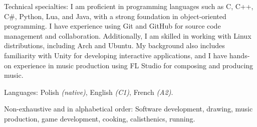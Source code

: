 \documentclass[10pt,a4paper]{article} %
\begin{document}

\inlineheadsection %
{Technical specialties:}
{I am proficient in programming languages such as C, C++, C\#, Python, Lua, and Java, 
with a strong foundation in object-oriented programming. I have experience using Git and 
GitHub for source code management and collaboration. Additionally, I am skilled in working 
with Linux distributions, including Arch and Ubuntu. My background also includes 
familiarity with Unity for developing interactive applications, and I have hands-on 
experience in music production using FL Studio for composing and producing music.}


\inlineheadsection %
{Languages:}
{Polish \textit{(native)}, English \textit{(C1)}, French \textit{(A2)}.}


\spacedhrule{1.6em}{-0.4em} %



\inlineheadsection %
{Non-exhaustive and in alphabetical order:}
{Software development, drawing, music production, game development, cooking, calisthenics, running.}

\end{document}
